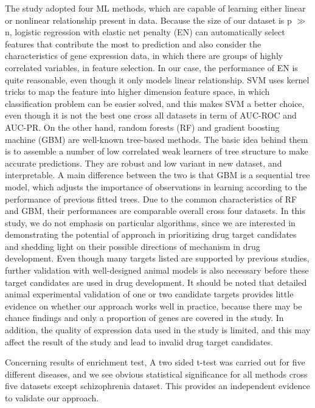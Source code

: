   The study adopted four ML methods, which are capable of learning either linear or nonlinear relationship present in data. Because the size of our dataset is p $\gg$ n, logistic regression with elastic net penalty (EN) can automatically select features that contribute the most to prediction and also consider the characteristics of gene expression data, in which there are groups of highly correlated variables, in feature selection. In our case, the performance of EN is quite reasonable, even though it only models linear relationship. SVM uses kernel tricks to map the feature into higher dimension feature space, in which classification problem can be easier solved, and this makes SVM a better choice, even though it is not the best one cross all datasets in term of AUC-ROC and AUC-PR. On the other hand, random forests (RF) and gradient boosting machine (GBM) are well-known tree-based methods. The basic idea behind them is to assemble a number of low correlated weak learners of tree structure to make accurate predictions. They are robust and low variant in new dataset, and interpretable. A main difference between the two is that GBM is a sequential tree model, which adjusts the importance of observations in learning according to the performance of previous fitted trees. Due to the common characteristics of RF and GBM, their performances are comparable overall cross four datasets. In this study, we do not emphasis on particular algorithms, since we are interested in demonstrating the potential of approach in prioritizing drug target candidates and shedding light on their possible directions of mechanism in drug development. Even though many targets listed are supported by previous studies, further validation with well-designed animal models is also necessary before these target candidates are used in drug development. It should be noted that detailed animal experimental validation of one or two candidate targets provides little evidence on whether our approach works well in practice, because there may be chance findings and only a proportion of genes are covered in the study. In addition, the quality of expression data used in the study is limited, and this may affect the result of the study and lead to invalid drug target candidates.
  
  Concerning results of enrichment test, A two sided t-test was carried out for five different diseases, and we see obvious statistical significance for all methods cross five datasets except schizophrenia dataset. This provides an independent evidence to validate our approach.

